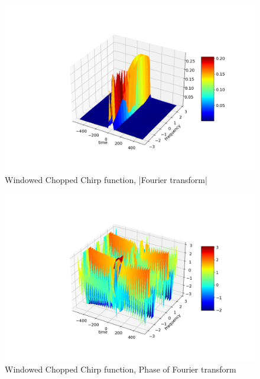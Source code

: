 \documentclass{article}
\begin{document}
\begin{figure}[!tbh]
\centering
\includegraphics[scale=0.4]{plots/windowed_surfacemag.png}
\caption{Windowed Chopped Chirp function, |Fourier transform|}
\label{fig:16}
\end{figure}

\begin{figure}[!tbh]
\centering
\includegraphics[scale=0.4]{plots/windowed_surfaceangles.png}
\caption{Windowed Chopped Chirp function, Phase of Fourier transform}
\label{fig:17}
\end{figure}

\newpage
\end{document}
